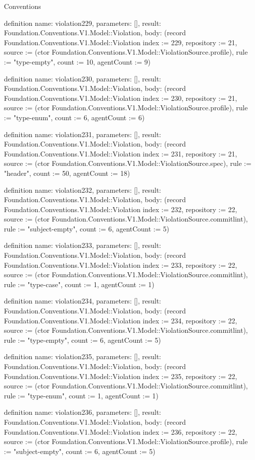 \begin{lexlean}{Conventions}
\begin{semanticmodule}
definition{
  name: violation229,
  parameters: [],
  result: Foundation.Conventions.V1.Model::Violation,
  body: (record Foundation.Conventions.V1.Model::Violation {index := 229, repository := 21, source := (ctor Foundation.Conventions.V1.Model::ViolationSource.profile), rule := "type-empty", count := 10, agentCount := 9})
}

definition{
  name: violation230,
  parameters: [],
  result: Foundation.Conventions.V1.Model::Violation,
  body: (record Foundation.Conventions.V1.Model::Violation {index := 230, repository := 21, source := (ctor Foundation.Conventions.V1.Model::ViolationSource.profile), rule := "type-enum", count := 6, agentCount := 6})
}

definition{
  name: violation231,
  parameters: [],
  result: Foundation.Conventions.V1.Model::Violation,
  body: (record Foundation.Conventions.V1.Model::Violation {index := 231, repository := 21, source := (ctor Foundation.Conventions.V1.Model::ViolationSource.spec), rule := "header", count := 50, agentCount := 18})
}

definition{
  name: violation232,
  parameters: [],
  result: Foundation.Conventions.V1.Model::Violation,
  body: (record Foundation.Conventions.V1.Model::Violation {index := 232, repository := 22, source := (ctor Foundation.Conventions.V1.Model::ViolationSource.commitlint), rule := "subject-empty", count := 6, agentCount := 5})
}

definition{
  name: violation233,
  parameters: [],
  result: Foundation.Conventions.V1.Model::Violation,
  body: (record Foundation.Conventions.V1.Model::Violation {index := 233, repository := 22, source := (ctor Foundation.Conventions.V1.Model::ViolationSource.commitlint), rule := "type-case", count := 1, agentCount := 1})
}

definition{
  name: violation234,
  parameters: [],
  result: Foundation.Conventions.V1.Model::Violation,
  body: (record Foundation.Conventions.V1.Model::Violation {index := 234, repository := 22, source := (ctor Foundation.Conventions.V1.Model::ViolationSource.commitlint), rule := "type-empty", count := 6, agentCount := 5})
}

definition{
  name: violation235,
  parameters: [],
  result: Foundation.Conventions.V1.Model::Violation,
  body: (record Foundation.Conventions.V1.Model::Violation {index := 235, repository := 22, source := (ctor Foundation.Conventions.V1.Model::ViolationSource.commitlint), rule := "type-enum", count := 1, agentCount := 1})
}

definition{
  name: violation236,
  parameters: [],
  result: Foundation.Conventions.V1.Model::Violation,
  body: (record Foundation.Conventions.V1.Model::Violation {index := 236, repository := 22, source := (ctor Foundation.Conventions.V1.Model::ViolationSource.profile), rule := "subject-empty", count := 6, agentCount := 5})
}


\end{semanticmodule}
\end{lexlean}
